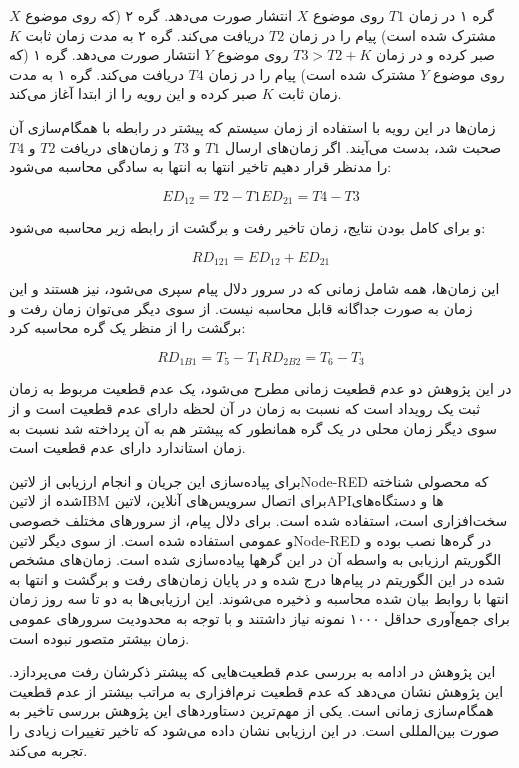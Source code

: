  گره ۱ در زمان $T1$ روی موضوع $X$ انتشار صورت می‌دهد.
 گره ۲ (که روی موضوع $X$ مشترک شده است) پیام را در زمان $T2$ دریافت می‌کند.
 گره ۲ به مدت زمان ثابت $K$ صبر کرده و در زمان $T3>T2+K$ روی موضوع $Y$ انتشار صورت می‌دهد.
 گره ۱ (که روی موضوع $Y$ مشترک شده است) پیام را در زمان $T4$ دریافت می‌کند.
 گره ۱ به مدت زمان ثابت $K$ صبر کرده و این رویه را از ابتدا آغاز می‌کند.

زمان‌ها در این رویه با استفاده از زمان سیستم که پیشتر در رابطه با همگام‌سازی آن صحبت شد، بدست می‌آیند.
اگر زمان‌های ارسال $T1$ و $T3$ و زمان‌های دریافت $T2$ و $T4$ را مدنظر قرار دهیم تاخیر انتها به انتها به سادگی محاسبه می‌شود:

\[
  ED_{12} = T2 - T1
  ED_{21} = T4 - T3
\]

و برای کامل بودن نتایج، زمان تاخیر رفت و برگشت از رابطه زیر محاسبه می‌شود:

\[
  RD_{121} = ED_{12} + ED_{21}
\]

این زمان‌ها، همه شامل زمانی که در سرور دلال پیام سپری می‌شود، نیز هستند و این زمان به صورت جداگانه قابل محاسبه نیست.
از سوی دیگر می‌توان زمان رفت و برگشت را از منظر یک گره محاسبه کرد:

\[
  RD_{1B1} = T_{5} - T_{1}
  RD_{2B2} = T_{6} - T_{3}
\]

در این پژوهش دو عدم قطعیت زمانی مطرح می‌شود، یک عدم قطعیت مربوط به زمان ثبت یک رویداد است که نسبت به زمان در آن لحظه دارای عدم قطعیت است و از سوی
دیگر زمان محلی در یک گره همانطور که پیشتر هم به آن پرداخته شد نسبت به زمان استاندارد دارای عدم قطعیت است.

برای پیاده‌سازی این جریان و انجام ارزیابی از ‌لاتین{Node-RED} که محصولی شناخته شده از ‌لاتین{IBM} برای اتصال سرویس‌های آنلاین، ‌لاتین{API}ها و
دستگاه‌های سخت‌افزاری است، استفاده شده است. برای دلال پیام، از سرور‌های مختلف خصوصی و عمومی استفاده شده است.
از سوی دیگر ‌لاتین{Node-RED} در گره‌ها نصب بوده و الگوریتم ارزیابی به واسطه آن در این گرهها پیاده‌سازی شده است.
زمان‌های مشخص شده در این الگوریتم در پیام‌ها درج شده و در پایان زمان‌های رفت و برگشت و انتها به انتها با روابط بیان شده محاسبه و ذخیره می‌شوند.
این ارزیابی‌ها به دو تا سه روز زمان برای جمع‌آوری حداقل ۱۰۰۰ نمونه نیاز داشتند و با توجه به محدودیت سرورهای عمومی زمان بیشتر متصور نبوده است.

این پژوهش در ادامه به بررسی عدم قطعیت‌هایی که پیشتر ذکرشان رفت می‌پردازد. این پژوهش نشان می‌دهد که عدم قطعیت نرم‌افزاری به مراتب
بیشتر از عدم قطعیت همگام‌سازی زمانی است. یکی از مهم‌ترین دستاوردهای این پژوهش بررسی تاخیر به صورت بین‌المللی است. در این ارزیابی
نشان داده می‌شود که تاخیر تغییرات زیادی را تجربه می‌کند.

